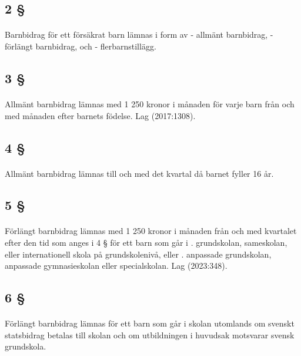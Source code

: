 \documentclass[a4paper,notitlepage,openany,10pt]{book}
\begin{document}
\subsection*{2 §}
\paragraph*{}
Barnbidrag för ett försäkrat barn lämnas i form av
\newline - allmänt barnbidrag,
\newline - förlängt barnbidrag, och
\newline - flerbarnstillägg.
\subsection*{3 §}
\paragraph*{}
Allmänt barnbidrag lämnas med 1 250 kronor i månaden för varje barn från och med månaden efter barnets födelse.
Lag (2017:1308).
\subsection*{4 §}
\paragraph*{}
Allmänt barnbidrag lämnas till och med det kvartal då barnet fyller 16 år.
\subsection*{5 §}
\paragraph*{}
Förlängt barnbidrag lämnas med 1 250 kronor i månaden från och med kvartalet efter den tid som anges i 4 § för ett barn som går i
. grundskolan, sameskolan, eller internationell skola på grundskolenivå, eller
. anpassade grundskolan, anpassade gymnasieskolan eller specialskolan.
Lag (2023:348).
\subsection*{6 §}
\paragraph*{}
Förlängt barnbidrag lämnas för ett barn som går i skolan utomlands om svenskt statsbidrag betalas till skolan och om utbildningen i huvudsak motsvarar svensk grundskola.
\end{document}

